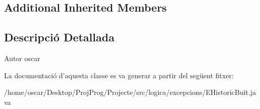 \subsection*{Additional Inherited Members}


\subsection{Descripció Detallada}
\begin{DoxyAuthor}{Autor}
oscar 
\end{DoxyAuthor}


La documentació d'aquesta classe es va generar a partir del següent fitxer\+:\begin{DoxyCompactItemize}
\item 
/home/oscar/\+Desktop/\+Proj\+Prog/\+Projecte/src/logica/excepcions/E\+Historic\+Buit.\+java\end{DoxyCompactItemize}
